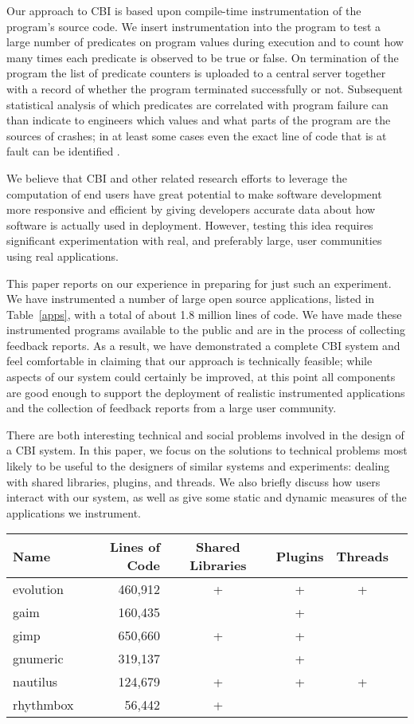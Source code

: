 \documentclass[times,10pt,twocolumn]{article}
\begin{document}
Our approach to CBI is based upon compile-time instrumentation of the
program's source code.  We insert instrumentation into the program to
test a large number of predicates on program values during
execution and to count how many times each predicate is observed to be
true or false.  On termination of the program the list of predicate
counters is uploaded to a central server together with a record of
whether the program terminated successfully or not.  Subsequent
statistical analysis of which predicates are correlated with program
failure can than indicate to engineers which values and what parts of
the program are the sources of crashes; in at least some cases even
the exact line of code that is at fault can be identified \cite{Liblit:2003:SUEBI,Zheng:2003:SDSP,PLDI`03*141}.

We believe that CBI and other related research efforts to leverage the 
computation of end users have great potential to make software development
more responsive and efficient by giving developers accurate data about
how software is actually used in deployment.  However, testing this idea
requires significant experimentation with real, and preferably large,
 user communities using real applications.  

This paper reports on our experience in preparing for just such an
experiment.  We have instrumented a number of large open source
applications, listed in Table~\ref{apps}, with a total of about 1.8
million lines of code. We have made these instrumented programs
available to the public and are in the process of collecting feedback
reports.  As a result, we have demonstrated a complete CBI system and
feel comfortable in claiming that our approach is technically
feasible; while aspects of our system could certainly be improved, at
this point all components are good enough to support the deployment of
realistic instrumented applications and the collection of feedback
reports from a large user community.

There are both interesting technical and social problems involved in
the design of a CBI system.  In this paper, we focus on the solutions
to technical problems most likely to be useful to the designers of
similar systems and experiments: dealing with shared libraries,
plugins, and threads.  We also briefly discuss how users interact with
our system, as well as give some static and dynamic measures of the
applications we instrument.

\begin{table*}
  \centering
  \begin{tabular}{lrcccc}
    Name & Lines of Code & Shared Libraries & Plugins & Threads \\\hline
    evolution & 460,912 & + & + & + \\
    gaim & 160,435 & & + & \\
    gimp & 650,660 & + & + & \\
    gnumeric & 319,137 & & + & \\
    nautilus & 124,679 & + & + & + \\
    rhythmbox & 56,442 & + & &
  \end{tabular}
  \caption{Instrumented applications.}
  \label{apps}
\end{table*}
\end{document}
